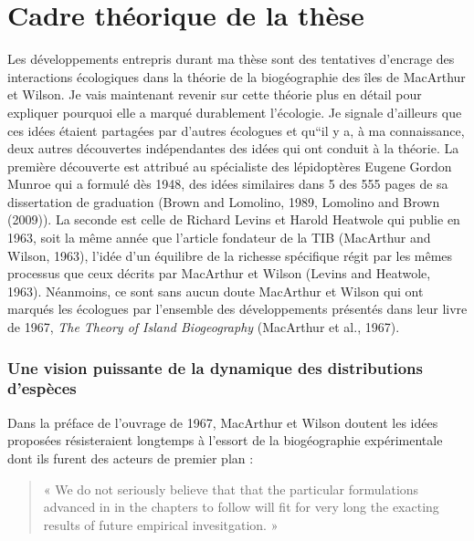 \section*{Cadre théorique de la
thèse}\label{cadre-thuxe9orique-de-la-thuxe8se}

Les développements entrepris durant ma thèse sont des tentatives
d'encrage des interactions écologiques dans la théorie de la
biogéographie des îles de MacArthur et Wilson. Je vais maintenant
revenir sur cette théorie plus en détail pour expliquer pourquoi elle a
marqué durablement l'écologie. Je signale d'ailleurs que ces idées
étaient partagées par d'autres écologues et qu``il y a, à ma
connaissance, deux autres découvertes indépendantes des idées qui ont
conduit à la théorie. La première découverte est attribué au spécialiste
des lépidoptères Eugene Gordon Munroe qui a formulé dès 1948, des idées
similaires dans 5 des 555 pages de sa dissertation de graduation (Brown
and Lomolino, 1989, Lomolino and Brown (2009)). La seconde est celle de
Richard Levins et Harold Heatwole qui publie en 1963, soit la même année
que l'article fondateur de la TIB (MacArthur and Wilson, 1963), l'idée
d'un équilibre de la richesse spécifique régit par les mêmes processus
que ceux décrits par MacArthur et Wilson (Levins and Heatwole, 1963).
Néanmoins, ce sont sans aucun doute MacArthur et Wilson qui ont marqués
les écologues par l'ensemble des développements présentés dans leur
livre de 1967, \emph{The Theory of Island Biogeography} (MacArthur et
al., 1967).

\subsubsection*{Une vision puissante de la dynamique des distributions
d'espèces}\label{une-vision-puissante-de-la-dynamique-des-distributions-despuxe8ces}

Dans la préface de l'ouvrage de 1967, MacArthur et Wilson doutent les
idées proposées résisteraient longtemps à l'essort de la biogéographie
expérimentale dont ils furent des acteurs de premier plan :

\begin{quote}
« We do not seriously believe that that the particular formulations
advanced in in the chapters to follow will fit for very long the
exacting results of future empirical invesitgation. »
\end{quote}

